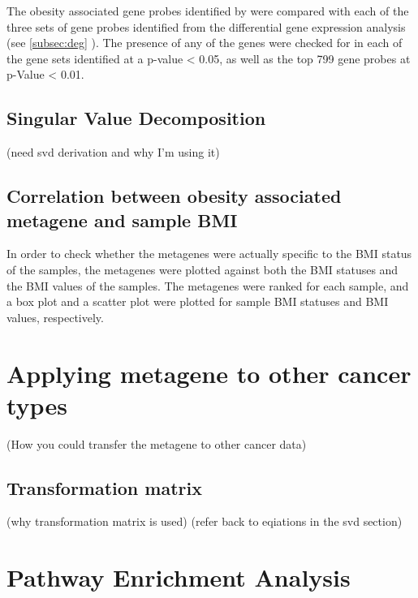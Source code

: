The obesity associated gene probes identified by \citet{Creighton2012} were compared with each of the three sets of gene probes identified from the differential gene expression analysis (see \ref{subsec:deg} ).
The presence of any of the \citet{Creighton2012} genes were checked for in each of the gene sets identified at a p-value \textless{} 0.05, as well as the top 799 gene probes at p-Value \textless{} 0.01.

\subsection{Singular Value Decomposition}
\label{subsec:svd}

(need svd derivation and why I'm using it)

\subsection{Correlation between obesity associated metagene and sample BMI}
\label{subsec:metavsbmi}

In order to check whether the metagenes were actually specific to the BMI status of the samples, the metagenes were plotted against both the BMI statuses and the BMI values of the samples.
The metagenes were ranked for each sample, and a box plot and a scatter plot were plotted for sample BMI statuses and BMI values, respectively.

\section{Applying metagene to other cancer types}
\label{sec:metagene}

(How you could transfer the metagene to other cancer data)

\subsection{Transformation matrix}
\label{subsec:transmat}

(why transformation matrix is used)
(refer back to eqiations in the  svd section)

\section{Pathway Enrichment Analysis}
\label{sec:pathenrich}








